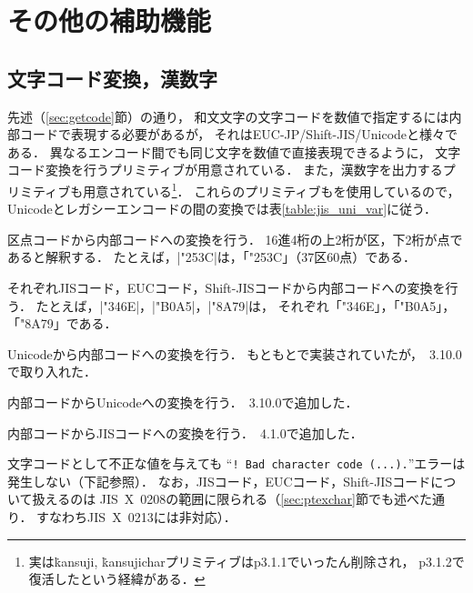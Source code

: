 \documentclass[a4paper,11pt,nomag,dvipdfmx]{jsarticle}
\begin{document}
\section{その他の補助機能}

\subsection{文字コード変換，漢数字}
\label{sec:convert}
先述（\ref{sec:getcode}節）の通り，
和文文字の文字コードを数値で指定するには内部コードで表現する必要があるが，
それはEUC-JP/Shift-JIS/Unicodeと様々である．
異なるエンコード間でも同じ文字を数値で直接表現できるように，
文字コード変換を行うプリミティブが用意されている．
また，漢数字を出力するプリミティブも用意されている\footnote{%
実は\.{kansuji}, \.{kansujichar}プリミティブはp3.1.1でいったん削除され，
p3.1.2で復活したという経緯がある．}．
これらのプリミティブもを使用しているので，
Unicodeとレガシーエンコードの間の変換では表\ref{table:jis_uni_var}に従う．

\begin{cslist}
  区点コードから内部コードへの変換を行う．
  16進4桁の上2桁が区，下2桁が点であると解釈する．
  たとえば，|\char\kuten"253C|は，「\char\kuten"253C」（37区60点）である．

  それぞれJISコード，EUCコード，Shift-JISコードから内部コードへの変換を行う．
  たとえば，|\char\jis"346E|，|\char\euc"B0A5|，|\char\sjis"8A79|は，
  それぞれ「\char\jis"346E」，「\char\euc"B0A5」，「\char\sjis"8A79」である．

  Unicodeから内部コードへの変換を行う．
  もともと\upTeX で実装されていたが，\pTeX~3.10.0で取り入れた．

  内部コードからUnicodeへの変換を行う．\pTeX~3.10.0で追加した．

  内部コードからJISコードへの変換を行う．\pTeX~4.1.0で追加した．
\end{cslist}

文字コードとして不正な値を与えても
``\verb|! Bad character code (...).|''エラーは発生しない（下記参照）．
なお，JISコード，EUCコード，Shift-JISコードについて扱えるのは
JIS~X~0208の範囲に限られる（\ref{sec:ptexchar}節でも述べた通り．
すなわちJIS~X~0213には非対応）．
\end{document}
